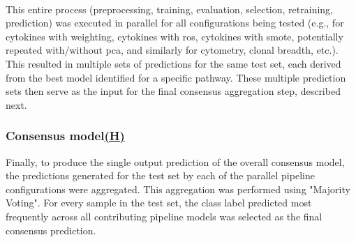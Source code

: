 \documentclass[12pt,a4paper]{report}
\begin{document}
\\
This entire process (preprocessing, training, evaluation, selection, retraining, prediction) was executed in parallel for all configurations being tested (e.g., for cytokines with weighting, cytokines with \gls{ros}, cytokines with \gls{smote}, potentially repeated with/without \gls{pca}, and similarly for cytometry, clonal breadth, etc.). This resulted in multiple sets of predictions for the same test set, each derived from the best model identified for a specific pathway. These multiple prediction sets then serve as the input for the final consensus aggregation step, described next.

\subsubsection*{Consensus model\hyperref[fig:pipeline-1]{(H)}}
Finally, to produce the single output prediction of the overall consensus model, the predictions generated for the test set by each of the parallel pipeline configurations were aggregated. This aggregation was performed using "Majority Voting". For every sample in the test set, the class label predicted most frequently across all contributing pipeline models was selected as the final consensus prediction.
\end{document}
